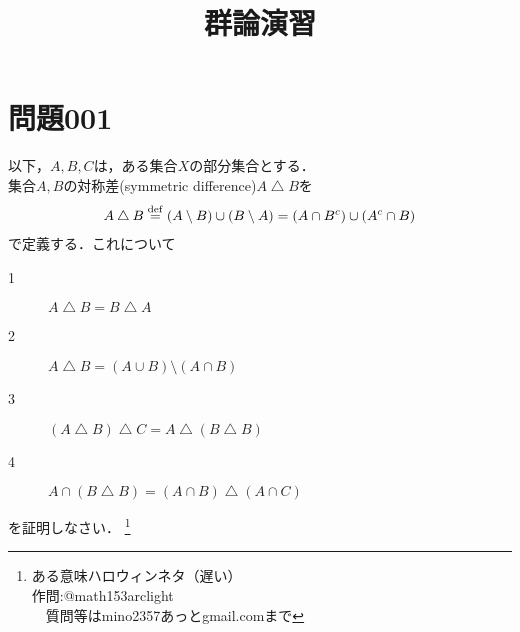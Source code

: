 \documentclass[12pt]{jarticle}
\title{群論演習}
\date{}
\begin{document}
\maketitle
{}
\section*{問題001}
以下，$A,B,C$は，ある集合$X$の部分集合とする． \\
集合$A,B$の対称差(symmetric difference)$A\bigtriangleup B$を
%
 \begin{eqnarray*}
A\bigtriangleup B \stackrel{{\rm def}}{=} (A \setminus B) \cup(B \setminus A) = (A \cap B^c) \cup (A^c \cap B)
\end{eqnarray*}
%
で定義する．これについて
%
\begin{description}
  \item[1] $A \bigtriangleup B = B \bigtriangleup A$
  \item[2] $A \bigtriangleup B = (A \cup B) \setminus (A \cap B)$
  \item[3] $(A \bigtriangleup B) \bigtriangleup C = A \bigtriangleup (B \bigtriangleup B)$
  \item[4] $A \cap (B \bigtriangleup B) = (A \cap B) \bigtriangleup (A \cap C)$
\end{description}
を証明しなさい．
\footnote[0]{
ある意味ハロウィンネタ（遅い）\\

作問:@math153arclight\\
　質問等はmino2357あっとgmail.comまで
}

\thispagestyle{empty}
\end{document}
